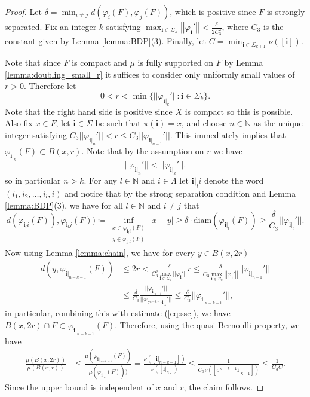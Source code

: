 \documentclass{PRM}
\newcommand{\field}[1]{\mathbb{#1}}
\newcommand{\N}{\field{N}}
\newcommand{\norm}[1]{\left|\left|#1\right|\right|}
\newcommand{\diam}{\mathrm{diam}}
\theoremstyle{plain}
\theoremstyle{definition}
\theoremstyle{remark}
\begin{document}
\begin{proof}
Let $\delta = \min_{i\ne j}d(\varphi_i(F),\varphi_j(F))$, which is positive since $F$ is strongly separated. Fix an integer $k$ satisfying $\max_{\mathbf{i}\in\Sigma_k}\norm{\varphi_{\mathbf{i}}'}< \frac{\delta}{2C_3^2}$, where $C_3$ is the constant given by Lemma \ref{lemma:BDP}(3). Finally, let $C=\min_{\mathbf{i}\in\Sigma_{k+1}}\nu([\mathbf{i}])$.

Note that since $F$ is compact and $\mu$ is fully supported on $F$ by Lemma \ref{lemma:doubling_small_r} it suffices to consider only uniformly small values of $r>0$.
Therefore let 
\begin{equation*}
0<r<\min\{||\varphi_{\mathbf{i}|_k}'||\colon \mathbf{i}\in\Sigma_k\}.
\end{equation*}
Note that the right hand side is positive since $X$ is compact so this is possible. Also fix $x\in F$, let $\mathbf{i}\in\Sigma$ be such that $\pi(\mathbf{i})=x$, and choose $n\in\N$ as the unique integer satisfying $C_3||\varphi_{\mathbf{i}|_n}'||< r \leq C_3||\varphi_{\mathbf{i}|_{n-1}}'||$. This immediately implies that $\varphi_{\mathbf{i}|_n}(F)\subset B(x,r)$. Note that by the assumption on $r$ we have
\begin{equation*}
    ||\varphi_{\mathbf{i}|_n}'|| <||\varphi_{\mathbf{i}|_k}'||.
\end{equation*}
so in particular $n>k$. For any $l\in\N$ and $i\in\Lambda$ let $\mathbf{i}|_li$ denote the word $(i_1,i_2,\ldots, i_l,i)$ and notice that by the strong separation condition and Lemma \ref{lemma:BDP}(3), we have for all $l\in\N$ and $i\ne j$ that
\begin{equation}\label{eq:ssc}
    d(\varphi_{\mathbf{i}_l i}(F)),\varphi_{\mathbf{i}_l j}(F))\coloneqq\inf_{\substack{x\in \varphi_{\mathbf{i}_l i}(F) \\y\in \varphi_{\mathbf{i}_l j}(F)}}|x-y|\geq \delta\cdot \diam(\varphi_{\mathbf{i}|_l}(F))\geq \frac{\delta}{C_3}||\varphi_{\mathbf{i}|_l}'||.
\end{equation}
Now using Lemma \ref{lemma:chain}, we have for every $y\in B(x,2r)$
\begin{align*}
    d(y,\varphi_{\mathbf{i}|_{n-k-1}}(F))&\leq 2r< \frac{\delta}{C_3^2\max_{\mathbf{i}\in\Sigma_k}||\varphi_{\mathbf{i}}'||}r\leq \frac{\delta}{C_3\max_{\mathbf{i}\in\Sigma_k}\norm{\varphi_{\mathbf{i}}'}}||\varphi_{\mathbf{i}|_{n-1}}'||\\
    &\leq\frac{\delta}{C_3}\frac{||\varphi_{\mathbf{i}|_{n-1}}'||}{||\varphi_{\sigma^{n-k-1}\mathbf{i}|_{k}}'||}\leq \frac{\delta}{C_3} ||\varphi_{\mathbf{i}|_{n-k-1}}'||,
\end{align*}
in particular, combining this with estimate (\ref{eq:ssc}), we have $B(x,2r)\cap F\subset \varphi_{\mathbf{i}|_{n-k-1}}(F)$. Therefore, using the quasi-Bernoulli property, we have
\begin{align*}
    \frac{\mu(B(x,2r))}{\mu(B(x,r))}&\leq \frac{\mu(\varphi_{\mathbf{i}|_{n-k-1}}(F))}{\mu(\varphi_{\mathbf{i}|_{n}}(F)))}=\frac{\nu([\mathbf{i}|_{n-k-1}])}{\nu([\mathbf{i}|_{n}])}\leq \frac{1}{C_3\nu([\sigma^{n-k-1}\mathbf{i}|_{k+1}])}\leq \frac{1}{C_3C}.
\end{align*}
Since the upper bound is independent of $x$ and $r$, the claim follows.
\end{proof}
\end{document}
